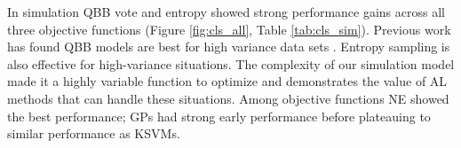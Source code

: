 \documentclass{sig-alternate}
\begin{document}
In simulation QBB vote and entropy showed strong performance gains across all three objective functions (Figure \ref{fig:cls_all}, Table \ref{tab:cls_sim}).
Previous work has found QBB models are best for high variance data sets \cite{schein2007:al-logreg-eval}.
Entropy sampling is also effective for high-variance situations.
The complexity of our simulation model made it a highly variable function to optimize and demonstrates the value of AL methods that can handle these situations.
Among objective functions NE showed the best performance; GPs had strong early performance before plateauing to similar performance as KSVMs.
\end{document}
